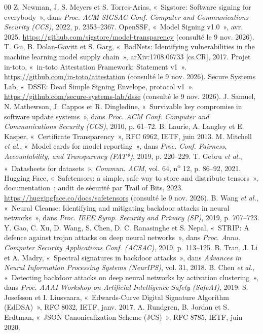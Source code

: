 \documentclass[conference]{IEEEtran}
\begin{document}
\begin{thebibliography}{00}
 Z. Newman, J. S. Meyers et S. Torres-Arias, «~Sigstore: Software signing for everybody~», dans \emph{Proc. ACM SIGSAC Conf. Computer and Communications Security (CCS)}, 2022, p. 2353--2367.
 OpenSSF, «~Model Signing v1.0~», avr. 2025. \url{https://github.com/sigstore/model-transparency} (consulté le 9 nov. 2026).
 T. Gu, B. Dolan-Gavitt et S. Garg, «~BadNets: Identifying vulnerabilities in the machine learning model supply chain~», arXiv:1708.06733 [cs.CR], 2017.
 Projet in-toto, «~in-toto Attestation Framework: Statement v1~». \url{https://github.com/in-toto/attestation} (consulté le 9 nov. 2026).
 Secure Systems Lab, «~DSSE: Dead Simple Signing Envelope, protocol v1~». \url{https://github.com/secure-systems-lab/dsse} (consulté le 9 nov. 2026).
 J. Samuel, N. Mathewson, J. Cappos et R. Dingledine, «~Survivable key compromise in software update systems~», dans \emph{Proc. ACM Conf. Computer and Communications Security (CCS)}, 2010, p. 61--72.
 B. Laurie, A. Langley et E. Kasper, «~Certificate Transparency~», RFC 6962, IETF, juin 2013.
 M. Mitchell \emph{et al.}, «~Model cards for model reporting~», dans \emph{Proc. Conf. Fairness, Accountability, and Transparency (FAT*)}, 2019, p. 220--229.
 T. Gebru \emph{et al.}, «~Datasheets for datasets~», \emph{Commun. ACM}, vol. 64, n\textsuperscript{o} 12, p. 86--92, 2021.
 Hugging Face, «~Safetensors: a simple, safe way to store and distribute tensors~», documentation~; audit de sécurité par Trail of Bits, 2023. \url{https://huggingface.co/docs/safetensors} (consulté le 9 nov. 2026).
 B. Wang \emph{et al.}, «~Neural Cleanse: Identifying and mitigating backdoor attacks in neural networks~», dans \emph{Proc. IEEE Symp. Security and Privacy (SP)}, 2019, p. 707--723.
 Y. Gao, C. Xu, D. Wang, S. Chen, D. C. Ranasinghe et S. Nepal, «~STRIP: A defence against trojan attacks on deep neural networks~», dans \emph{Proc. Annu. Computer Security Applications Conf. (ACSAC)}, 2019, p. 113--125.
 B. Tran, J. Li et A. Madry, «~Spectral signatures in backdoor attacks~», dans \emph{Advances in Neural Information Processing Systems (NeurIPS)}, vol. 31, 2018.
 B. Chen \emph{et al.}, «~Detecting backdoor attacks on deep neural networks by activation clustering~», dans \emph{Proc. AAAI Workshop on Artificial Intelligence Safety (SafeAI)}, 2019.
 S. Josefsson et I. Liusvaara, «~Edwards-Curve Digital Signature Algorithm (EdDSA)~», RFC 8032, IETF, janv. 2017.
 A. Rundgren, B. Jordan et S. Erdtman, «~JSON Canonicalization Scheme (JCS)~», RFC 8785, IETF, juin 2020.
\end{thebibliography}
\end{document}
